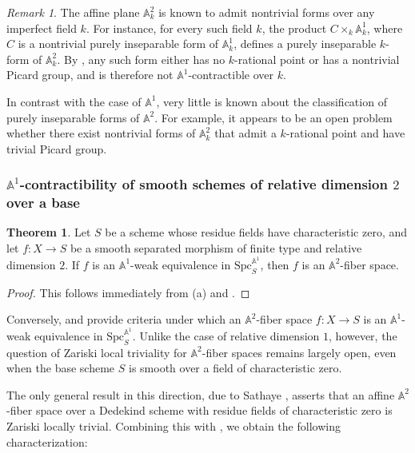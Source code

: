 \documentclass[10pt]{amsart}
\renewcommand{\AA}{\mathbb{A}}
\numberwithin{equation}{section} %
\theoremstyle{plain}
\theoremstyle{definition}
\newtheorem{theorem}[theorem]{Theorem}
\theoremstyle{remark}
\newtheorem{remark}[remark]{Remark}
\begin{document}
\begin{remark}
The affine plane $\AA^2_k$ is known to admit nontrivial forms over any imperfect field $k$. For instance, for every such field $k$, the product $C\times_k \AA^1_k$, where $C$ is a nontrivial purely inseparable form of $\AA^1_k$, defines a purely inseparable $k$-form of $\AA^2_k$. By , any such form either has no $k$-rational point or has a nontrivial Picard group, and is therefore not $\AA^1$-contractible over $k$.
\smallskip

In contrast with the case of $\AA^1$, very little is known about the classification of purely inseparable forms of $\AA^2$. For example, it appears to be an open problem whether there exist nontrivial forms of $\AA^2_k$ that admit a $k$-rational point and have trivial Picard group.
\end{remark}

\subsubsection{$\AA^1$-contractibility of smooth schemes of relative dimension $2$ over a base}
\label{sect:reldim=2}

\begin{theorem}\label{thm:Reldim2}
Let $S$ be a scheme whose residue fields have characteristic zero, and let $f:X\to S$ be a smooth separated morphism of finite type and relative dimension $2$. If $f$ is an $\AA^1$-weak equivalence in $\mathrm{Spc}_S^{\AA^1}$, then $f$ is an $\AA^2$-fiber space.
\end{theorem}

\begin{proof}
This follows immediately from (a) and .
\end{proof}

Conversely,  and  provide criteria under which an $\AA^2$-fiber space $f:X\to S$ is an $\AA^1$-weak equivalence in $\mathrm{Spc}_S^{\AA^1}$. Unlike the case of relative dimension $1$, however, the question of Zariski local triviality for $\AA^2$-fiber spaces remains largely open, even when the base scheme $S$ is smooth over a field of characteristic zero.
\smallskip

The only general result in this direction, due to Sathaye \cite{sathaye1983polynomial}, asserts that an affine $\AA^2$-fiber space over a Dedekind scheme with residue fields of characteristic zero is Zariski locally trivial. Combining this with , we obtain the following characterization:
\end{document}
